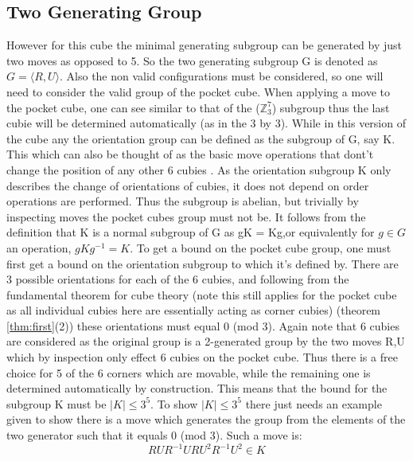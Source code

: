 \documentclass{article}
\newcounter{theo}[section]\setcounter{theo}{0}
\newcounter{lem}[section]\setcounter{lem}{0}
\begin{document}
\subsection{Two Generating Group}

However for this cube the minimal generating subgroup can be generated by just two moves as opposed to 5. So the two generating subgroup G is denoted as $G = \langle R, U\rangle$. Also the non valid configurations must be considered, so one will need to consider the valid group of the pocket cube. When applying a move to the pocket cube, one can see similar to that of the ($\mathbb{Z}_{3}^{7}$) subgroup thus the last cubie will be determined automatically (as in the 3 by 3). While in this version of the cube any the orientation group can be defined as the subgroup of G, say K. This which can also be thought of as the basic move operations that dont't change the position of any other 6 cubies \cite{bump2006unravelling}. As the orientation subgroup K only describes the change of orientations of cubies, it does not depend on order operations are performed. Thus the subgroup is abelian, but trivially by inspecting moves the pocket cubes group must not be. It follows from the definition that K is a normal subgroup of G as gK = Kg,or equivalently for $g \in G$ an operation, $gKg^{-1} = K$. To get a bound on the pocket cube group, one must first get a bound on the orientation subgroup to which it's defined by. There are 3 possible orientations for each of the 6 cubies, and following from  the fundamental theorem for cube theory (note this still applies for the pocket cube as all individual cubies here are essentially acting as corner cubies) (theorem \ref{thm:first}(2)) these orientations must equal 0 (mod 3). Again note that 6 cubies are considered as the original group is a 2-generated group by the two moves R,U which by inspection only effect 6 cubies on the pocket cube. Thus there is a free choice for 5 of the 6 corners which are movable, while the remaining one is determined automatically by construction. This means that the bound for the subgroup K must be $|K| \leq 3^5$. To show $|K| \leq 3^5$ there just needs an example given to show there is a move which generates the group from the elements of the two generator such that it equals 0 (mod 3). Such a move is:
\begin{equation}
RUR^{-1}URU^{2}R^{-1}U^{2} \in K
\end{equation}

\newcommand{\changecorner}{[Orient 3 Corner],R,U,Rp,U,R,U2,Rp,U2}%
\newcommand{\changecornerarrow}{$\quad\overrightarrow{\strut\textsc{Orienting the corner}}\quad$}
\end{document}
